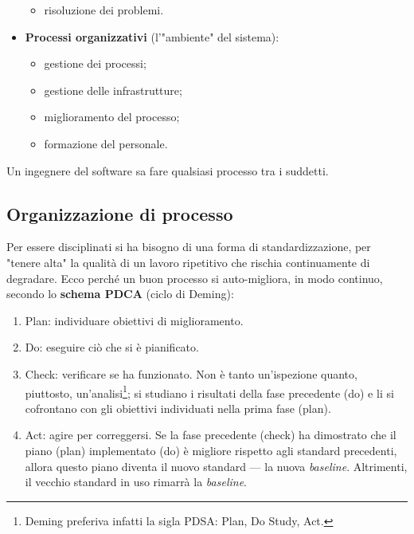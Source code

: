 \documentclass[a4paper]{article}
\begin{document}
\begin{itemize}
\begin{itemize}
	\item risoluzione dei problemi.
				
	\end{itemize}

			
			
	\item \textbf{Processi organizzativi} (l'"ambiente" del sistema):
				
	\begin{itemize}
		
					
	\item gestione dei processi;
					
	\item gestione delle infrastrutture;
					
	\item miglioramento del processo;
					
	\item formazione del personale.
				
	\end{itemize}

			
		
	\end{itemize}

		
Un ingegnere del software sa fare qualsiasi processo tra i suddetti.

		
	\subsection{Organizzazione di processo}

		
Per essere disciplinati si ha bisogno di una forma di standardizzazione, per "tenere alta" la qualità di un lavoro ripetitivo che rischia continuamente di degradare. Ecco perché un buon processo si auto-migliora, in modo continuo, secondo lo \textbf{schema PDCA} (ciclo di Deming):
		
	\begin{enumerate}
		
			
	\item Plan: individuare obiettivi di miglioramento.
			
	\item Do: eseguire ciò che si è pianificato.
			
	\item Check: verificare se ha funzionato. Non è tanto un'ispezione quanto, piuttosto, un'analisi\footnote{Deming preferiva infatti la sigla PDSA: Plan, Do Study, Act.}; si studiano i risultati della fase precedente (do) e li si cofrontano con gli obiettivi individuati nella prima fase (plan).
			
	\item Act: agire per correggersi. Se la fase precedente (check) ha dimostrato che il piano (plan) implementato (do) è migliore rispetto agli standard precedenti, allora questo piano diventa il nuovo standard --- la nuova \emph{baseline}. Altrimenti, il vecchio standard in uso rimarrà la \emph{baseline}.
		
	\end{enumerate}
\end{document}
